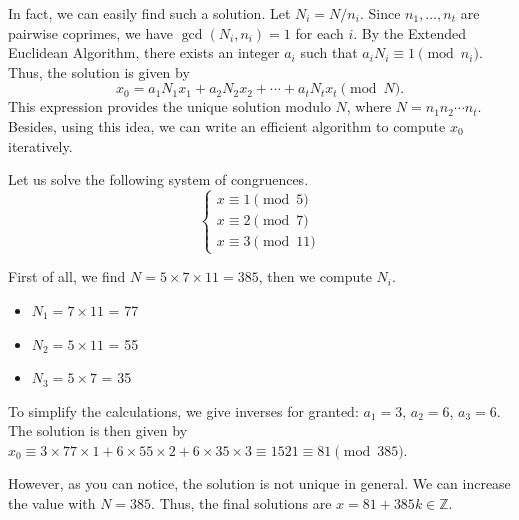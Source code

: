 \documentclass[../lecture-notes-148x210.tex]{subfiles}
\begin{document}
In fact, we can easily find such a solution. Let $N_i = N/n_i$. Since
$n_1,\dots,n_t$ are pairwise coprimes, we have $\gcd(N_i, n_i) = 1$ for each
$i$. By the Extended Euclidean Algorithm, there exists an integer $a_i$ such
that $a_iN_i \equiv 1 \pmod{n_i}$. Thus, the solution is given by 
\begin{equation*}
    x_0 = a_1N_1x_1 + a_2N_2x_2 + \cdots + a_tN_tx_t \pmod{N}.
\end{equation*}
This expression provides the unique solution modulo $N$, where $N = n_1 n_2 \cdots n_t$. 
Besides, using this idea, we can write an efficient algorithm to compute $x_0$ iteratively.

\begin{example}
    Let us solve the following system of congruences.
    \begin{equation*}    
        \begin{cases}
            x \equiv 1 \pmod{5} \\
            x \equiv 2 \pmod{7} \\
            x \equiv 3 \pmod{11}
        \end{cases}
    \end{equation*}

    First of all, we find $N = 5 \times 7 \times 11 = 385$, then we compute $N_i$. \\
    \vspace{-7mm}
    \begin{multicols*}{2}    
        \begin{itemize}
            \item $N_1 = 7 \times 11$ = 77
            \item $N_2 = 5 \times 11$ = 55
            \item $N_3 = 5 \times 7$ = 35
        \end{itemize}
    \end{multicols*}
    \vspace{-3mm}

    To simplify the calculations, we give inverses for granted: $a_1 = 3$, $a_2
    = 6$, $a_3 = 6$. The solution is then given by $x_0 \equiv 3 \times 77 \times 1 + 6
    \times 55 \times 2 + 6 \times 35 \times 3 \equiv 1521 \equiv 81 \pmod{385}$.
    
    However, as you can notice, the solution is not unique in general. We can
    increase the value with $N = 385$. Thus, the final solutions are $x = 81 +
    385k \in \mathbb{Z}$.
\end{example}
\end{document}
